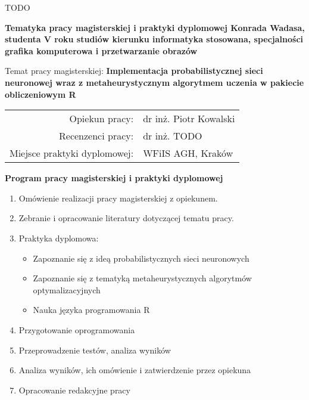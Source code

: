 \documentclass[a4paper,12pt,twoside]{article}
\begin{document}
\newpage
\mbox{}
\vfill{%
\begin{flushright}
    TODO
\end{flushright}
}

\mbox{}

\newpage
\begin{center}
{\bf Tematyka pracy magisterskiej i praktyki dyplomowej
Konrada Wadasa,
studenta V roku studiów kierunku informatyka stosowana, specjalności grafika komputerowa i przetwarzanie obrazów}\\
\end{center}

Temat pracy magisterskiej:
{\bf Implementacja probabilistycznej sieci neuronowej wraz z metaheurystycznym algorytmem uczenia w pakiecie obliczeniowym R}\\

\begin{tabular}{rl}

Opiekun pracy:                  & dr inż. Piotr Kowalski\\
Recenzenci pracy:               & dr inż. TODO\\
Miejsce praktyki dyplomowej:    & WFiIS AGH, Kraków\\
\end{tabular}

\begin{center}
{\bf Program pracy magisterskiej i praktyki dyplomowej}
\end{center}

\begin{enumerate}
\item Omówienie realizacji pracy magisterskiej z opiekunem.
\item Zebranie i opracowanie literatury dotyczącej tematu pracy.
\item Praktyka dyplomowa:
\begin{itemize}
\item Zapoznanie się z ideą probabilistycznych sieci neuronowych
\item Zapoznanie się z tematyką metaheurystycznych algorytmów optymalizacyjnych
\item Nauka języka programowania R
\end{itemize}
\item Przygotowanie oprogramowania
\item Przeprowadzenie testów, analiza wyników
\item Analiza wyników, ich omówienie i zatwierdzenie przez opiekuna
\item Opracowanie redakcyjne pracy
\end{enumerate}
\end{document}

